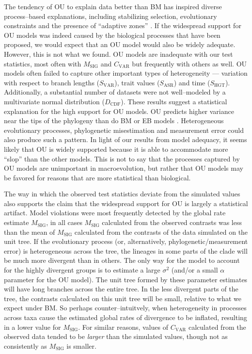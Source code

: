 \documentclass[a4paper,11pt]{article}
\begin{document}
The tendency of OU to explain data better than BM has inspired diverse process--based explanations, including stabilizing selection, evolutionary constraints and the presence of ``adaptive zones'' \citep{HansenMartins1996, ButlerKing2004, Hansen2012book, PennellHarmon}. 
If the widespread support for OU models was indeed caused by the biological processes that have been proposed, we would expect that an OU model would also be widely adequate. However, this is not what we found. OU models are inadequate with our test statistics, most often with $M_{\text{SIG}}$ and $C_{\text{VAR}}$ but frequently with others as well. OU models often failed to capture other important types of heterogeneity --- variation with respect to branch lengths ($S_{\text{VAR}}$), trait values ($S_{\text{ASR}}$) and time ($S_{\text{HGT}}$). Additionally, a substantial number of datasets were not well--modeled by a multivariate normal distribution ($D_{\text{CDF}}$). These results suggest a statistical explanation for the high support for OU models. OU predicts higher variance near the tips of the phylogeny than do BM or EB models \citep[see figure 1 in][]{Harmon2010}. Heterogeneous evolutionary processes, phylogenetic misestimation and measurement error \citep{Houle2011, Hansen2012} could also produce such a pattern. In light of our results from model adequacy, it seems likely that OU is widely supported because it is able to accommodate more ``slop'' than the other models.  This is not to say that the processes captured by OU models are unimportant in macroevolution, but rather that OU models may be favored for reasons that are more statistical than biological.

The way in which the observed test statistics deviate from the simulated values also supports the claim that the widespread support for OU is largely a statistical artifact. 
Model violations were most frequently detected by the global rate estimate $M_{\text{SIG}}$, in all cases $M_{\text{SIG}}$ calculated from the observed contrasts was less than the mean of $M_{\text{SIG}}$ calculated from the contrasts of the data simulated on the unit tree. If the evolutionary process (or, alternatively, phylogenetic/measurement error) is heterogeneous across the tree, the lineages in some parts of the clade will be much more divergent than in others. The only way for the model to account for the highly divergent groups is to estimate a large $\sigma^2$ (and/or a small $\alpha$ parameter for the OU model). The unit tree formed by these parameter estimates will have long branches across the entire tree. In the less divergent parts of the tree, the contrasts calculated on this unit tree will be small, relative to what we expect under BM. So perhaps counter--intuitvely, when heterogeneity in processes across taxa cause the estimated global rates of divergence to be inflated, resulting in a lower value for $M_{\text{SIG}}$. For similar reasons, values of $C_{\text{VAR}}$ calculated from the observed data tended to be \emph{larger} than the simulated values, though not as consistently as $M_{\text{SIG}}$ is smaller. 
\end{document}
